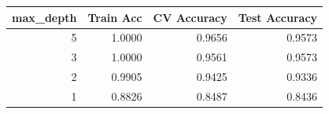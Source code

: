 \begin{tabular}{rrrr}
\toprule
max\_depth & Train Acc & CV Accuracy & Test Accuracy \\
\midrule
5 & 1.0000 & 0.9656 & 0.9573 \\
3 & 1.0000 & 0.9561 & 0.9573 \\
2 & 0.9905 & 0.9425 & 0.9336 \\
1 & 0.8826 & 0.8487 & 0.8436 \\
\bottomrule
\end{tabular}
